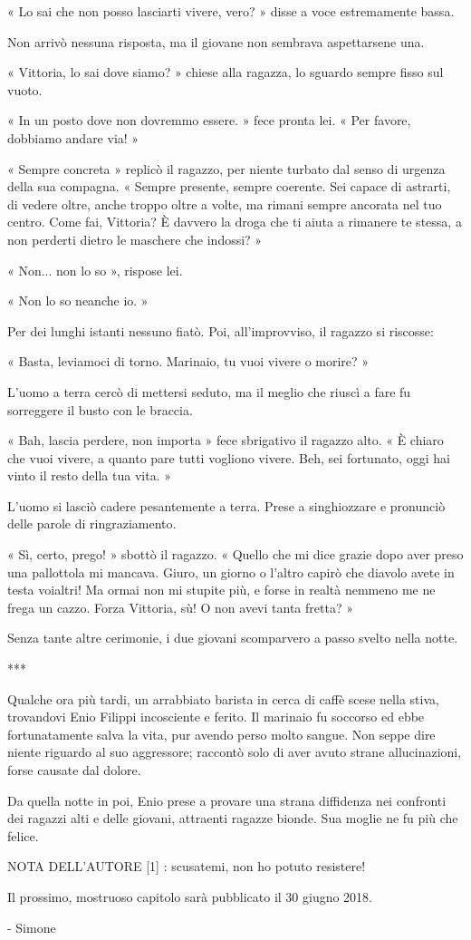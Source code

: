 « Lo sai che non posso lasciarti vivere, vero? » disse a voce estremamente bassa.

Non arrivò nessuna risposta, ma il giovane non sembrava aspettarsene una.

« Vittoria, lo sai dove siamo? » chiese alla ragazza, lo sguardo sempre fisso sul vuoto.

« In un posto dove non dovremmo essere. » fece pronta lei. « Per favore, dobbiamo andare via! »

« Sempre concreta » replicò il ragazzo, per niente turbato dal senso di urgenza della sua compagna. « Sempre presente, sempre coerente. Sei capace di astrarti, di vedere oltre, anche troppo oltre a volte, ma rimani sempre ancorata nel tuo centro. Come fai, Vittoria? È davvero la droga che ti aiuta a rimanere te stessa, a non perderti dietro le maschere che indossi? »

« Non... non lo so », rispose lei.

« Non lo so neanche io. »

Per dei lunghi istanti nessuno fiatò. Poi, all'improvviso, il ragazzo si riscosse:

« Basta, leviamoci di torno. Marinaio, tu vuoi vivere o morire? »

L'uomo a terra cercò di mettersi seduto, ma il meglio che riuscì a fare fu sorreggere il busto con le braccia.

« Bah, lascia perdere, non importa » fece sbrigativo il ragazzo alto. « È chiaro che vuoi vivere, a quanto pare tutti vogliono vivere. Beh, sei fortunato, oggi hai vinto il resto della tua vita. »

L'uomo si lasciò cadere pesantemente a terra. Prese a singhiozzare e pronunciò delle parole di ringraziamento.

« Sì, certo, prego! » sbottò il ragazzo. « Quello che mi dice grazie dopo aver preso una pallottola mi mancava. Giuro, un giorno o l'altro capirò che diavolo avete in testa voialtri! Ma ormai non mi stupite più, e forse in realtà nemmeno me ne frega un cazzo. Forza Vittoria, sù! O non avevi tanta fretta? »

Senza tante altre cerimonie, i due giovani scomparvero a passo svelto nella notte.

***

Qualche ora più tardi, un arrabbiato barista in cerca di caffè scese nella stiva, trovandovi Enio Filippi incosciente e ferito. Il marinaio fu soccorso ed ebbe fortunatamente salva la vita, pur avendo perso molto sangue. Non seppe dire niente riguardo al suo aggressore; raccontò solo di aver avuto strane allucinazioni, forse causate dal dolore.

Da quella notte in poi, Enio prese a provare una strana diffidenza nei confronti dei ragazzi alti e delle giovani, attraenti ragazze bionde. Sua moglie ne fu più che felice.

NOTA DELL'AUTORE
[1] : scusatemi, non ho potuto resistere!

Il prossimo, mostruoso capitolo sarà pubblicato il 30 giugno 2018.

- Simone



